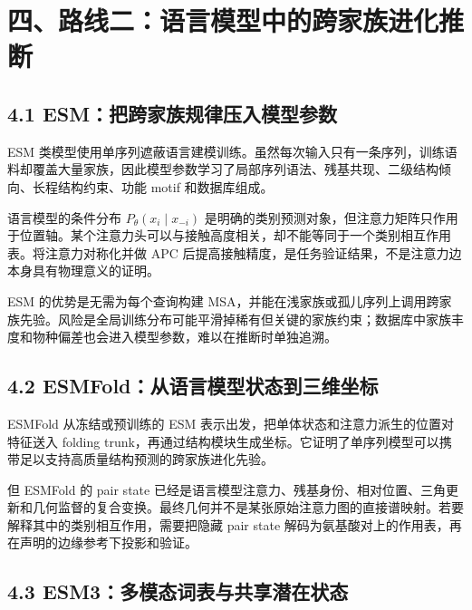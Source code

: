 \documentclass[10pt]{article}
\begin{document}
\section*{四、路线二：语言模型中的跨家族进化推断}


\subsection*{4.1 ESM：把跨家族规律压入模型参数}


ESM 类模型使用单序列遮蔽语言建模训练。虽然每次输入只有一条序列，训练语料却覆盖大量家族，因此模型参数学习了局部序列语法、残基共现、二级结构倾向、长程结构约束、功能 motif 和数据库组成。\par

语言模型的条件分布 \(P_\theta(x_i\mid x_{-i})\) 是明确的类别预测对象，但注意力矩阵只作用于位置轴。某个注意力头可以与接触高度相关，却不能等同于一个类别相互作用表。将注意力对称化并做 APC 后提高接触精度，是任务验证结果，不是注意力边本身具有物理意义的证明。\par

ESM 的优势是无需为每个查询构建 MSA，并能在浅家族或孤儿序列上调用跨家族先验。风险是全局训练分布可能平滑掉稀有但关键的家族约束；数据库中家族丰度和物种偏差也会进入模型参数，难以在推断时单独追溯。\par

\subsection*{4.2 ESMFold：从语言模型状态到三维坐标}


ESMFold 从冻结或预训练的 ESM 表示出发，把单体状态和注意力派生的位置对特征送入 folding trunk，再通过结构模块生成坐标。它证明了单序列模型可以携带足以支持高质量结构预测的跨家族进化先验。\par

但 ESMFold 的 pair state 已经是语言模型注意力、残基身份、相对位置、三角更新和几何监督的复合变换。最终几何并不是某张原始注意力图的直接谱映射。若要解释其中的类别相互作用，需要把隐藏 pair state 解码为氨基酸对上的作用表，再在声明的边缘参考下投影和验证。\par

\subsection*{4.3 ESM3：多模态词表与共享潜在状态}
\end{document}
